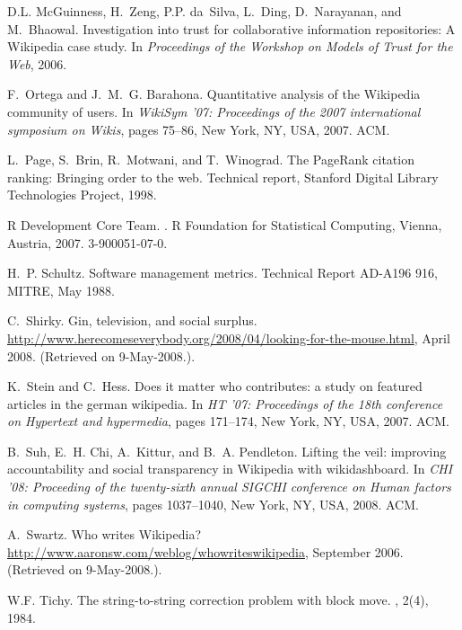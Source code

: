 \documentclass{sig-alternate}
\begin{document}
\begin{thebibliography}{10}
D.L. McGuinness, H.~Zeng, P.P. da~Silva, L.~Ding, D.~Narayanan, and M.~Bhaowal.
\newblock Investigation into trust for collaborative information repositories:
  {A} {Wikipedia} case study.
\newblock In {\em Proceedings of the Workshop on Models of Trust for the Web},
  2006.

F.~Ortega and J.~M.~G. Barahona.
\newblock Quantitative analysis of the {W}ikipedia community of users.
\newblock In {\em WikiSym '07: Proceedings of the 2007 international symposium
  on Wikis}, pages 75--86, New York, NY, USA, 2007. ACM.

L.~Page, S.~Brin, R.~Motwani, and T.~Winograd.
\newblock The {PageRank} citation ranking: Bringing order to the web.
\newblock Technical report, Stanford Digital Library Technologies Project,
  1998.

{R Development Core Team}.
.
\newblock R Foundation for Statistical Computing, Vienna, Austria, 2007.
 3-900051-07-0.

H.~P. Schultz.
\newblock Software management metrics.
\newblock Technical Report AD-A196 916, MITRE, May 1988.

C.~Shirky.
\newblock Gin, television, and social surplus.
\newblock
  \url{http://www.herecomeseverybody.org/2008/04/looking-for-the-mouse.html},
  April 2008.
\newblock (Retrieved on 9-May-2008.).

K.~Stein and C.~Hess.
\newblock Does it matter who contributes: a study on featured articles in the
  german wikipedia.
\newblock In {\em HT '07: Proceedings of the 18th conference on Hypertext and
  hypermedia}, pages 171--174, New York, NY, USA, 2007. ACM.

B.~Suh, E.~H. Chi, A.~Kittur, and B.~A. Pendleton.
\newblock Lifting the veil: improving accountability and social transparency in
  {W}ikipedia with wikidashboard.
\newblock In {\em CHI '08: Proceeding of the twenty-sixth annual SIGCHI
  conference on Human factors in computing systems}, pages 1037--1040, New
  York, NY, USA, 2008. ACM.

A.~Swartz.
\newblock Who writes {W}ikipedia?
\newblock \url{http://www.aaronsw.com/weblog/whowriteswikipedia}, September
  2006.
\newblock (Retrieved on 9-May-2008.).

W.F. Tichy.
\newblock The string-to-string correction problem with block move.
, 2(4), 1984.


\end{thebibliography}
\end{document}
